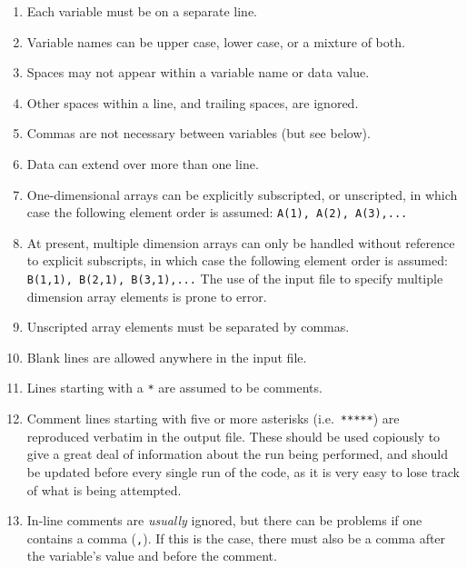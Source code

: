 \documentclass[11pt,a4paper]{report}
\begin{document}
\begin{enumerate}

\item Each variable must be on a separate line.

\item Variable names can be upper case, lower case, or a mixture of both.

\item Spaces may not appear within a variable name or data value.

\item Other spaces within a line, and trailing spaces, are ignored.

\item Commas are not necessary between variables (but see below).

\item Data can extend over more than one line.

\item One-dimensional arrays can be explicitly subscripted, or unscripted, in
  which case the following element order is assumed: \texttt{A(1), A(2),
    A(3),...}

\item At present, multiple dimension arrays can only be handled without
  reference to explicit subscripts, in which case the following element order
  is assumed: \texttt{B(1,1), B(2,1), B(3,1),...} The use of the input file to
  specify multiple dimension array elements is prone to error.

\item Unscripted array elements must be separated by commas.

\item Blank lines are allowed anywhere in the input file.

\item Lines starting with a \texttt{*} are assumed to be comments.

\item Comment lines starting with five or more asterisks (i.e.\
  \texttt{*****}) are reproduced verbatim in the output file. These should be
  used copiously to give a great deal of information about the run being
  performed, and should be updated before every single run of the code, as it
  is very easy to lose track of what is being attempted.

\item In-line comments are \textit{usually}\/ ignored, but there can be
  problems if one contains a comma (\texttt{,}). If this is the case, there
  must also be a comma after the variable's value and before the comment.

\end{enumerate}
\end{document}
